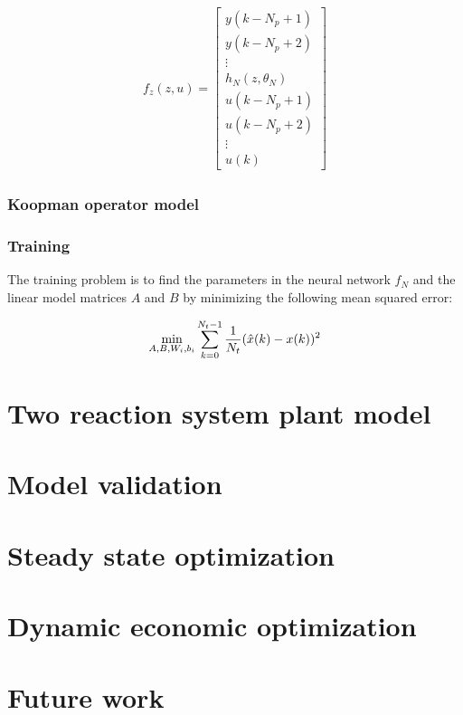 \documentclass[10pt]{article}
\begin{document}
\begin{align*}
  f_z(z, u) = \begin{bmatrix}
    y(k-N_p+1) \\
    y(k-N_p+2) \\
    \vdots \\
    h_N(z, \theta_N) \\
    u(k-N_p+1) \\ 
    u(k-N_p+2) \\
    \vdots \\
    u(k)
  \end{bmatrix}
\end{align*}

\subsubsection{Koopman operator model}

\subsubsection{Training}
The training problem is to find the parameters in the neural network
$f_N$ and the linear model matrices $A$ and $B$ by minimizing the following mean squared error:

\begin{align*}
  \underset{A, B, W_i, b_i}{\textnormal{min}} \sum_{k=0}^{N_t-1} 
  \dfrac{1}{N_t}(\hat{x}(k) - x(k))^2
\end{align*}

\section{Two reaction system plant model}

\section{Model validation}

\section{Steady state optimization}


\section{Dynamic economic optimization}


\section{Future work}
\end{document}
